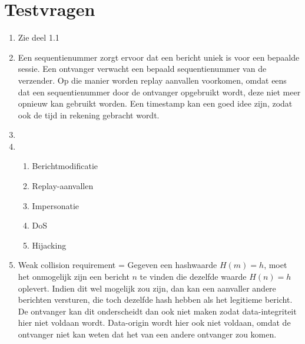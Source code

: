 \documentclass{report}
\begin{document}
	\section{Testvragen}
	\begin{enumerate}
		\item {}

		Zie deel 1.1
		\item {}

		Een sequentienummer zorgt ervoor dat een bericht uniek is voor een bepaalde sessie. Een  ontvanger verwacht een bepaald sequentienummer van de verzender. Op die manier worden replay aanvallen voorkomen, omdat eens dat een sequentienummer door de ontvanger opgebruikt wordt, deze niet meer opnieuw kan gebruikt worden. Een timestamp kan een goed idee zijn, zodat ook de tijd in rekening gebracht wordt.
		\item {}
		\item {}

		\begin{enumerate}
			\item Berichtmodificatie
			\item Replay-aanvallen
			\item Impersonatie
			\item DoS
			\item Hijacking
		\end{enumerate}

		\item {}

		Weak collision requirement = Gegeven een hashwaarde $H(m) = h$, moet het onmogelijk zijn een bericht $n$ te vinden die dezelfde waarde $H(n) = h$ oplevert. Indien dit wel mogelijk zou zijn, dan kan een aanvaller andere berichten versturen, die toch dezelfde hash hebben als het legitieme bericht. De ontvanger kan dit onderscheidt dan ook niet maken zodat data-integriteit hier niet voldaan wordt. Data-origin wordt hier ook niet voldaan, omdat de ontvanger niet kan weten dat het van een andere ontvanger zou komen.


\end{enumerate}
\end{document}
